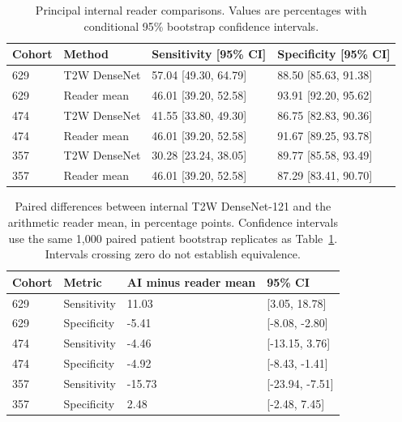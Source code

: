 \documentclass{article}
\newcommand{\zwrev}[1]{{\color{ZhixiangPink}#1}}
\begin{document}
\begin{table}[ht]
\centering
\caption{\zwrev{Principal internal reader comparisons. Values are percentages with conditional 95\% bootstrap confidence intervals.}}
\label{tab:zw-reader-ci}
{\color{ZhixiangPink}\small
\begin{tabular}{llll}
\toprule
Cohort & Method & Sensitivity [95\% CI] & Specificity [95\% CI]\\
\midrule
629 & T2W DenseNet & 57.04 [49.30, 64.79] & 88.50 [85.63, 91.38]\\
629 & Reader mean & 46.01 [39.20, 52.58] & 93.91 [92.20, 95.62]\\
474 & T2W DenseNet & 41.55 [33.80, 49.30] & 86.75 [82.83, 90.36]\\
474 & Reader mean & 46.01 [39.20, 52.58] & 91.67 [89.25, 93.78]\\
357 & T2W DenseNet & 30.28 [23.24, 38.05] & 89.77 [85.58, 93.49]\\
357 & Reader mean & 46.01 [39.20, 52.58] & 87.29 [83.41, 90.70]\\
\bottomrule
\end{tabular}}
\end{table}

\clearpage
\begin{table}[ht]
\centering
\caption{\zwrev{Paired differences between internal T2W DenseNet-121 and the arithmetic reader mean, in percentage points. Confidence intervals use the same 1,000 paired patient bootstrap replicates as Table~\ref{tab:zw-reader-ci}. Intervals crossing zero do not establish equivalence.}}
\label{tab:zw-paired-differences}
{\color{ZhixiangPink}\small
\begin{tabular}{llll}
\toprule
Cohort & Metric & AI minus reader mean & 95\% CI\\
\midrule
629 & Sensitivity & 11.03 & [3.05, 18.78]\\
629 & Specificity & -5.41 & [-8.08, -2.80]\\
474 & Sensitivity & -4.46 & [-13.15, 3.76]\\
474 & Specificity & -4.92 & [-8.43, -1.41]\\
357 & Sensitivity & -15.73 & [-23.94, -7.51]\\
357 & Specificity & 2.48 & [-2.48, 7.45]\\
\bottomrule
\end{tabular}}
\end{table}
\end{document}

